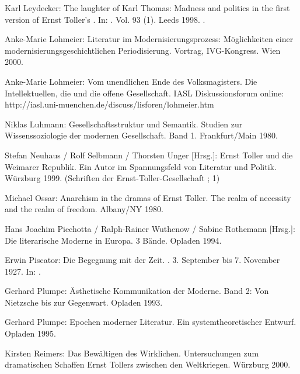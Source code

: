 \begin{BibList}{}
  Karl Leydecker: 
  The laughter of Karl Thomas: Madness and politics in the
  first version of Ernst Toller's \Cite{Hoppla, wir leben!}.
  In: . Vol. 93 (1). 
  Leeds 1998. .

  Anke-Marie Lohmeier:
  Literatur im Modernisierungsprozess: Möglichkeiten einer
  modernisierungsgeschichtlichen Periodisierung. Vortrag, IVG-Kongress. 
  Wien 2000.

  Anke-Marie Lohmeier:
  Vom unendlichen Ende des Volksmagisters. Die Intellektuellen, die
  \Cite{Massen} und die offene Gesellschaft.
  IASL Diskussionsforum online: 
  http://iasl.uni-muenchen.de/discuss/lisforen/lohmeier.htm

  Niklas Luhmann:
  Gesellschaftsstruktur und Semantik. Studien zur Wissenssoziologie der
  modernen Gesellschaft. Band 1.
  Frankfurt/Main 1980.

  Stefan Neuhaus / 
  Rolf Selbmann / 
  Thorsten Unger [Hrsg.]:
  Ernst Toller und die Weimarer Republik. Ein Autor im Spannungsfeld von
  Literatur und Politik.
  Würzburg 1999. (Schriften der Ernst-Toller-Gesellschaft ; 1)

  Michael Ossar:
  Anarchism in the dramas of Ernst Toller. The realm of necessity
  and the realm of freedom.
  Albany/NY 1980.
  
  Hans Joachim Piechotta / 
  Ralph-Rainer Wuthenow /
  Sabine Rothemann [Hrsg.]:
  Die literarische Moderne in Europa. 3 Bände.
  Opladen 1994.

  Erwin Piscator:
  Die Begegnung mit der Zeit. \Cite{Hoppla, wir leben!}. 3. September bis
  7. November 1927.
  In: .

  Gerhard Plumpe:
  Ästhetische Kommunikation der Moderne. Band 2: Von Nietzsche bis zur Gegenwart.
  Opladen 1993.

  Gerhard Plumpe:
  Epochen moderner Literatur. Ein systemtheoretischer Entwurf.
  Opladen 1995.

  Kirsten Reimers:
  Das Bewältigen des Wirklichen. Untersuchungen zum dramatischen
  Schaffen Ernst Tollers zwischen den Weltkriegen. 
  Würzburg 2000.


\end{BibList}
